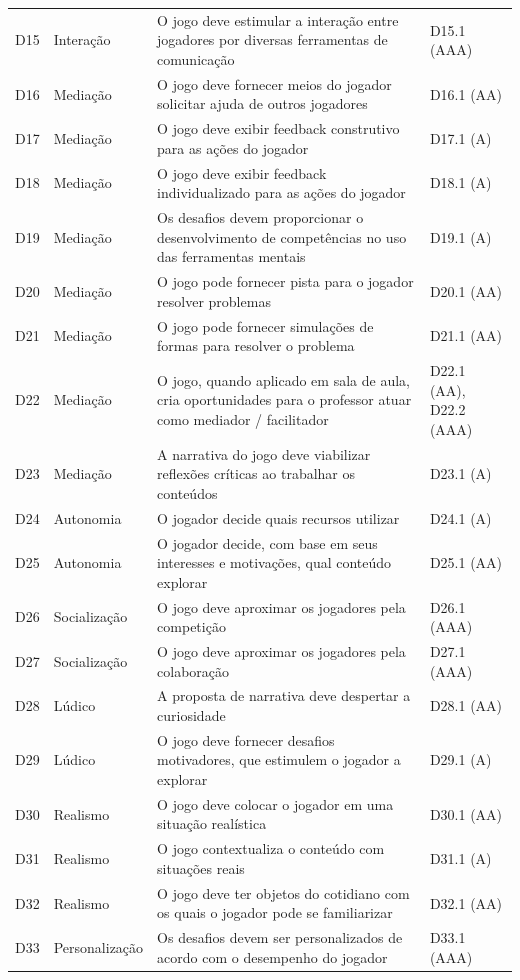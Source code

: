 \begin{longtable}{p{1.1cm}p{2.6cm}p{7.2cm}p{2.6cm}}
D15 & Interação & O jogo deve estimular a interação entre jogadores por diversas ferramentas de comunicação & D15.1 (AAA) \\
D16 & Mediação & O jogo deve fornecer meios do jogador solicitar ajuda de outros jogadores & D16.1 (AA) \\
D17 & Mediação & O jogo deve exibir feedback construtivo para as ações do jogador & D17.1 (A) \\
D18 & Mediação & O jogo deve exibir feedback individualizado para as ações do jogador & D18.1 (A) \\
D19 & Mediação & Os desafios devem proporcionar o desenvolvimento de competências no uso das ferramentas mentais & D19.1 (A) \\
D20 & Mediação & O jogo pode fornecer pista para o jogador resolver problemas & D20.1 (AA) \\
D21 & Mediação & O jogo pode fornecer simulações de formas para resolver o problema & D21.1 (AA) \\
D22 & Mediação & O jogo, quando aplicado em sala de aula, cria oportunidades para o professor atuar como mediador / facilitador & D22.1 (AA), D22.2 (AAA) \\
D23 & Mediação & A narrativa do jogo deve viabilizar reflexões críticas ao trabalhar os conteúdos & D23.1 (A) \\
D24 & Autonomia & O jogador decide quais recursos utilizar & D24.1 (A) \\
D25 & Autonomia & O jogador decide, com base em seus interesses e motivações, qual conteúdo explorar & D25.1 (AA) \\
D26 & Socialização & O jogo deve aproximar os jogadores pela competição & D26.1 (AAA) \\
D27 & Socialização & O jogo deve aproximar os jogadores pela colaboração & D27.1 (AAA) \\
D28 & Lúdico & A proposta de narrativa deve despertar a curiosidade & D28.1 (AA) \\
D29 & Lúdico & O jogo deve fornecer desafios motivadores, que estimulem o jogador a explorar & D29.1 (A) \\
D30 & Realismo & O jogo deve colocar o jogador em uma situação realística & D30.1 (AA) \\
D31 & Realismo & O jogo contextualiza o conteúdo com situações reais & D31.1 (A) \\
D32 & Realismo & O jogo deve ter objetos do cotidiano com os quais o jogador pode se familiarizar & D32.1 (AA) \\
D33 & Personalização & Os desafios devem ser personalizados de acordo com o desempenho do jogador & D33.1 (AAA) \\

\end{longtable}

